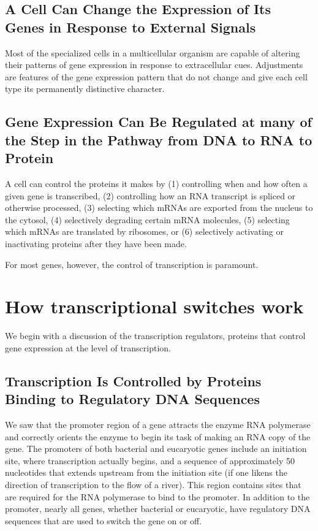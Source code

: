 \subsection{A Cell Can Change the Expression of Its Genes in Response to External Signals}

Most of the specialized cells in a multicellular organism are capable of
altering their patterns of gene expression in response to extracellular
cues. Adjustments are features of the gene expression pattern
that do not change and give each cell type its permanently distinctive
character.

\subsection{Gene Expression Can Be Regulated at many of the Step in the Pathway from DNA to RNA to Protein}

A cell can control the proteins it makes
by (1) controlling when and how often a given gene is transcribed, (2)
controlling how an RNA transcript is spliced or otherwise processed, (3)
selecting which mRNAs are exported from the nucleus to the cytosol,
(4) selectively degrading certain mRNA molecules, (5) selecting which
mRNAs are translated by ribosomes, or (6) selectively activating or inactivating
proteins after they have been made.

For most genes, however, the control of transcription is paramount.

\section{How transcriptional switches work}

We begin with a discussion of the transcription regulators,
proteins that control gene expression at the level of transcription.

\subsection{Transcription Is Controlled by Proteins Binding to Regulatory DNA Sequences}

We saw that the promoter region of a gene
attracts the enzyme RNA polymerase and correctly orients the enzyme to
begin its task of making an RNA copy of the gene. The promoters of both
bacterial and eucaryotic genes include an initiation site, where transcription
actually begins, and a sequence of approximately 50 nucleotides that
extends upstream from the initiation site (if one likens the direction of
transcription to the flow of a river). This region contains sites that are
required for the RNA polymerase to bind to the promoter. In addition
to the promoter, nearly all genes, whether bacterial or eucaryotic, have
regulatory DNA sequences that are used to switch the gene on or off.

